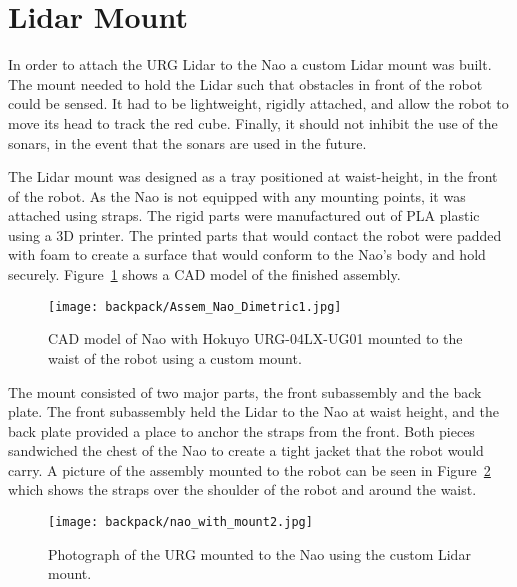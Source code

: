 \section{Lidar Mount}
In order to attach the URG Lidar to the Nao a custom Lidar mount was built.
The mount needed to hold the Lidar such that obstacles in front of the robot
could be sensed. It had to be lightweight, rigidly attached, and allow
the robot to move its head to track the red cube. Finally, it should not inhibit
the use of the sonars, in the event that the sonars are used in the future.

The Lidar mount was designed as a tray positioned at waist-height, 
in the front of the robot.
As the Nao is not equipped with any mounting points, it was attached
using straps. The rigid parts were manufactured out of PLA plastic using a 3D
printer. The printed parts that would contact the robot were padded with foam to
create a surface that would conform to the Nao's body and hold securely.
Figure~\ref{fig:nao_lidar_mount_nao_dimetric1} shows a CAD model of the finished
assembly.

\begin{figure}
\centering
\texttt{[image: backpack/Assem\_Nao\_Dimetric1.jpg]}
\caption{CAD model of Nao with Hokuyo URG-04LX-UG01 mounted
         to the waist of the robot using a custom mount.}
\label{fig:nao_lidar_mount_nao_dimetric1}
\end{figure}

The mount consisted of two major parts, the front subassembly and the back plate.
The front subassembly held the Lidar to the Nao at waist height, and the back plate
provided a place to anchor the straps from the front. Both pieces sandwiched the
chest of the Nao to create a tight jacket that the robot would carry.
A picture of the assembly mounted to the robot can be seen in
Figure~\ref{fig:nao_lidar_mount_picture1} which shows the straps over the
shoulder of the robot and around the waist.

\begin{figure}
\centering
\texttt{[image: backpack/nao\_with\_mount2.jpg]}
\caption{Photograph of the URG mounted to the Nao using the
         custom Lidar mount.}
\label{fig:nao_lidar_mount_picture1}
\end{figure}

